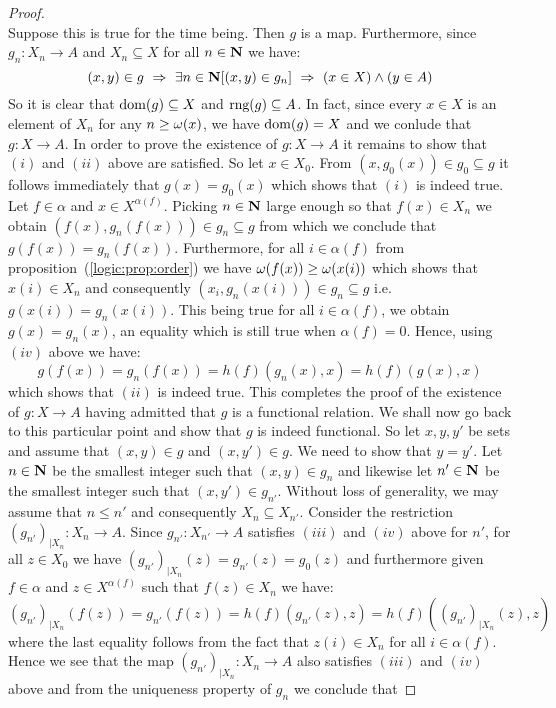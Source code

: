 \begin{proof}
\[    \]
Suppose this is true for the time being. Then $g$ is a map.
Furthermore, since $g_{n}:X_{n}\to A$ and $X_{n}\subseteq X$ for all
$n\in\mbox{$\bf N$}$ we have:
    \[
    (x,y)\in g\ \Rightarrow\ \exists n\in\mbox{$\bf N$} [(x,y)\in g_{n}]\ \Rightarrow\
    (x\in X)\land(y\in A)
    \]
So it is clear that $\mbox{\rm dom}(g)\subseteq X$ and $\mbox{\rm rng}(g)\subseteq A$.
In fact, since every $x\in X$ is an element of $X_{n}$ for any
$n\geq\mbox{$\omega$}(x)$, we have $\mbox{\rm dom}(g)=X$ and we conlude that $g:X\to A$.
In order to prove the existence of $g:X\to A$ it remains to show
that $(i)$ and $(ii)$ above are satisfied. So let $x\in X_{0}$. From
$(x,g_{0}(x))\in g_{0}\subseteq g$ it follows immediately that
$g(x)=g_{0}(x)$ which shows that $(i)$ is indeed true. Let
$f\in\alpha$ and $x\in X^{\alpha(f)}$. Picking $n\in\mbox{$\bf N$}$ large enough
so that $f(x)\in X_{n}$ we obtain $(f(x),g_{n}(f(x)))\in
g_{n}\subseteq g$ from which we conclude that $g(f(x))=g_{n}(f(x))$.
Furthermore, for all $i\in\alpha(f)$ from
proposition~(\ref{logic:prop:order}) we have
$\mbox{$\omega$}(f(x))\geq\mbox{$\omega$}(x(i))$ which shows that $x(i)\in X_{n}$ and
consequently $(x_{i},g_{n}(x(i)))\in g_{n}\subseteq g$ i.e.
$g(x(i))=g_{n}(x(i))$. This being true for all $i\in\alpha(f)$, we
obtain $g(x)=g_{n}(x)$, an equality which is still true when
$\alpha(f)=0$. Hence, using $(iv)$ above we have:
    \[
    g(f(x))=g_{n}(f(x))=h(f)(g_{n}(x),x)=h(f)(g(x),x)
    \]
which shows that $(ii)$ is indeed true. This completes the proof of
the existence of $g:X\to A$ having admitted that $g$ is a functional
relation. We shall now go back to this particular point and show
that $g$ is indeed functional. So let $x,y,y'$ be sets and assume
that $(x,y)\in g$ and $(x,y')\in g$. We need to show that $y=y'$.
Let $n\in\mbox{$\bf N$}$ be the smallest integer such that $(x,y)\in g_{n}$ and
likewise let $n'\in\mbox{$\bf N$}$ be the smallest integer such that $(x,y')\in
g_{n'}$. Without loss of generality, we may assume that $n\leq n'$
and consequently $X_{n}\subseteq X_{n'}$. Consider the restriction
$(g_{n'})_{|X_{n}}:X_{n}\to A$. Since $g_{n'}:X_{n'}\to A$ satisfies
$(iii)$ and $(iv)$ above for $n'$, for all $z\in X_{0}$ we have
$(g_{n'})_{|X_{n}}(z) = g_{n'}(z)=g_{0}(z)$ and furthermore given
$f\in\alpha$ and $z\in X^{\alpha(f)}$ such that $f(z)\in X_{n}$ we
have:
    \[
    (g_{n'})_{|X_{n}}(f(z)) = g_{n'}(f(z)) =
    h(f)(g_{n'}(z),z)=h(f)((g_{n'})_{|X_{n}}(z),z)
    \]
where the last equality follows from the fact that $z(i)\in X_{n}$
for all $i\in\alpha(f)$. Hence we see that the map
$(g_{n'})_{|X_{n}}:X_{n}\to A$ also satisfies $(iii)$ and $(iv)$
above and from the uniqueness property of $g_{n}$ we conclude that

\end{proof}
